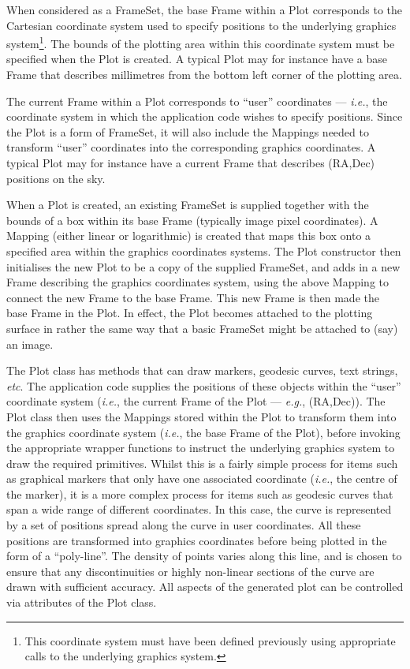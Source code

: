 \documentclass[final,authoryear,5p,times,twocolumn]{elsarticle}
\begin{document}
When considered as a FrameSet, the base Frame within a Plot corresponds
to the Cartesian coordinate system used to specify positions to the
underlying graphics system\footnote{This coordinate system must have been
defined previously using appropriate calls to the underlying graphics
system.}. The bounds of the plotting area within this coordinate system must
be specified when the Plot is created. A typical Plot may for instance
have a base Frame that describes millimetres from the bottom left corner
of the plotting area.

The current Frame within a Plot corresponds to ``user''  coordinates ---
\emph{i.e.}, the coordinate system in which the application code wishes to
specify positions. Since the Plot is a form of FrameSet, it will also
include the Mappings needed to transform ``user'' coordinates into the
corresponding graphics coordinates. A typical Plot may for instance
have a current Frame that describes (RA,Dec) positions on the sky.

When a Plot is created, an existing FrameSet is supplied together with
the bounds of a box within its base Frame (typically image pixel
coordinates). A Mapping (either linear or logarithmic) is created that
maps this box onto a specified area within the graphics coordinates
systems. The Plot constructor then initialises the new Plot to be a copy
of the supplied FrameSet, and adds in a new Frame describing the graphics
coordinates system, using the above Mapping to connect the new Frame to
the base Frame. This new Frame is then made the base Frame in the Plot.
In effect, the Plot becomes attached to the plotting surface in rather
the same way that a basic FrameSet might be attached to (say) an image.

The Plot class has methods that can draw markers, geodesic curves, text
strings, \emph{etc}. The application code supplies the positions of these
objects within the ``user'' coordinate system (\emph{i.e.}, the current
Frame of the Plot --- \emph{e.g.}, (RA,Dec)). The Plot class then uses the
Mappings stored within the Plot to transform them into the graphics
coordinate system (\emph{i.e.}, the base Frame of the Plot), before
invoking the appropriate wrapper functions to instruct the underlying
graphics system to draw the required primitives. Whilst this is a fairly
simple process for items such as graphical markers that only have one
associated coordinate (\emph{i.e.}, the centre of the marker), it is a
more complex process for items such as geodesic curves that span a wide
range of different coordinates. In this case, the curve is represented by
a set of positions spread along the curve in user coordinates. All these
positions are transformed into graphics coordinates before being plotted
in the form of a ``poly-line''. The density of points varies along this
line, and is chosen to ensure that any discontinuities or highly
non-linear sections of the curve are drawn with sufficient accuracy. All
aspects of the generated plot can be controlled via attributes of the Plot
class.
\end{document}
